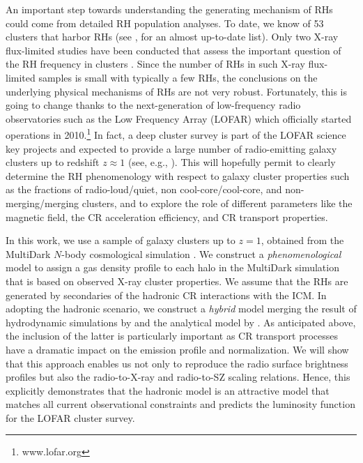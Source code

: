 \documentclass[traditabstract]{aa}
\begin{document}
An important step towards understanding the generating mechanism of RHs could
come from detailed RH population analyses. To date, we know of 53 clusters that
harbor RHs (see \citealp{2012A&ARv..20...54F}, for an almost up-to-date
list). Only two X-ray flux-limited studies have been conducted that assess the
important question of the RH frequency in clusters \citep{1999NewA....4..141G,
  VenturiGMRT_2}. Since the number of RHs in such X-ray flux-limited samples is
small with typically a few RHs, the conclusions on the underlying physical
mechanisms of RHs are not very robust. Fortunately, this is going to change
thanks to the next-generation of low-frequency radio observatories such as the
Low Frequency Array (LOFAR) which officially started operations in
2010.\footnote{www.lofar.org} In fact, a deep cluster survey is part of the
LOFAR science key projects and expected to provide a large number of
radio-emitting galaxy clusters up to redshift $z\approx1$ (see,
e.g., \citealp{2010A&A...509A..68C,2012JApA..tmp...34R}).  This will hopefully
permit to clearly determine the RH phenomenology with respect to galaxy cluster
properties such as the fractions of radio-loud/quiet, non cool-core/cool-core,
and non-merging/merging clusters, and to explore the role of different
parameters like the magnetic field, the CR acceleration efficiency, and CR
transport properties.

In this work, we use a sample of galaxy clusters up to $z= 1$, obtained from the
MultiDark $N$-body cosmological simulation \citep{2011arXiv1104.5130P}. We
construct a \emph{phenomenological} model to assign a gas density profile to
each halo in the MultiDark simulation that is based on observed X-ray cluster
properties. We assume that the RHs are generated by secondaries of the hadronic
CR interactions with the ICM. In adopting the hadronic scenario, we construct a
\emph{hybrid} model merging the result of hydrodynamic simulations by
\cite{2010MNRAS.409..449P} and the analytical model by
\cite{2011A&A...527A..99E}.  As anticipated above, the inclusion of the latter
is particularly important as CR transport processes have a dramatic impact on
the emission profile and normalization. We will show that this approach enables
us not only to reproduce the radio surface brightness profiles but also the
radio-to-X-ray and radio-to-SZ scaling relations. Hence, this explicitly
demonstrates that the hadronic model is an attractive model that matches all
current observational constraints and predicts the luminosity function for the LOFAR
cluster survey.
\end{document}
